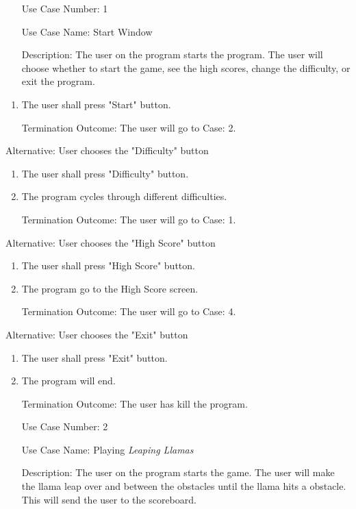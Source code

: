 \documentclass[10pt,conference,onecolumn,compsoc]{IEEEtran}
\begin{document}
\begin{itemize}
\item[Use Case Number:] 1
\item[Use Case Name:] Start Window
\item[Description:] The user on the program starts the program. The user will choose whether to start the game, see the high scores, change the difficulty, or exit the program.
\end{itemize}
\begin{enumerate}
\item The user shall press "Start" button.
\item[Termination Outcome:] The user will go to Case: 2.
\end{enumerate}
Alternative: User chooses the "Difficulty" button
\begin{enumerate}
\item The user shall press "Difficulty" button.
\item The program cycles through different difficulties.
\item[Termination Outcome:] The user will go to Case: 1.
\end{enumerate}
Alternative: User chooses the "High Score" button
\begin{enumerate}
\item The user shall press "High Score" button.
\item The program go to the High Score screen.
\item[Termination Outcome:] The user will go to Case: 4.
\end{enumerate}
Alternative: User chooses the "Exit" button
\begin{enumerate}
\item The user shall press "Exit" button.
\item The program will end.
\item[Termination Outcome:] The user has kill the program.
\end{enumerate}

\begin{itemize}
\item[Use Case Number:] 2
\item[Use Case Name:] Playing \textit{Leaping Llamas}
\item[Description:] The user on the program starts the game. The user will make the llama leap over and between the obstacles until the llama hits a obstacle. This will send the user to the scoreboard.
\end{itemize}
\end{document}
